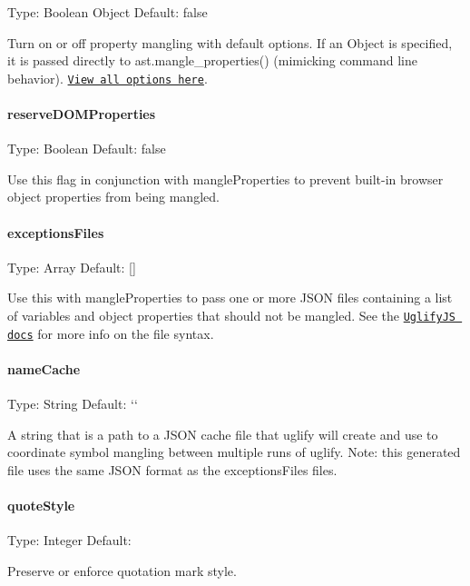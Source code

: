Type\+: {\ttfamily Boolean} {\ttfamily Object} Default\+: {\ttfamily false}

Turn on or off property mangling with default options. If an {\ttfamily Object} is specified, it is passed directly to {\ttfamily ast.\+mangle\+\_\+properties()} (mimicking command line behavior). \href{https://github.com/mishoo/UglifyJS2#mangler-options}{\tt View all options here}.

\paragraph*{reserve\+D\+O\+M\+Properties}

Type\+: {\ttfamily Boolean} Default\+: {\ttfamily false}

Use this flag in conjunction with {\ttfamily mangle\+Properties} to prevent built-\/in browser object properties from being mangled.

\paragraph*{exceptions\+Files}

Type\+: {\ttfamily Array} Default\+: {\ttfamily \mbox{[}\mbox{]}}

Use this with {\ttfamily mangle\+Properties} to pass one or more J\+S\+ON files containing a list of variables and object properties that should not be mangled. See the \href{https://www.npmjs.com/package/uglify-js}{\tt Uglify\+JS docs} for more info on the file syntax.

\paragraph*{name\+Cache}

Type\+: {\ttfamily String} Default\+: `\textquotesingle{}\textquotesingle{}`

A string that is a path to a J\+S\+ON cache file that uglify will create and use to coordinate symbol mangling between multiple runs of uglify. Note\+: this generated file uses the same J\+S\+ON format as the {\ttfamily exceptions\+Files} files.

\paragraph*{quote\+Style}

Type\+: {\ttfamily Integer} Default\+: {}

Preserve or enforce quotation mark style.


